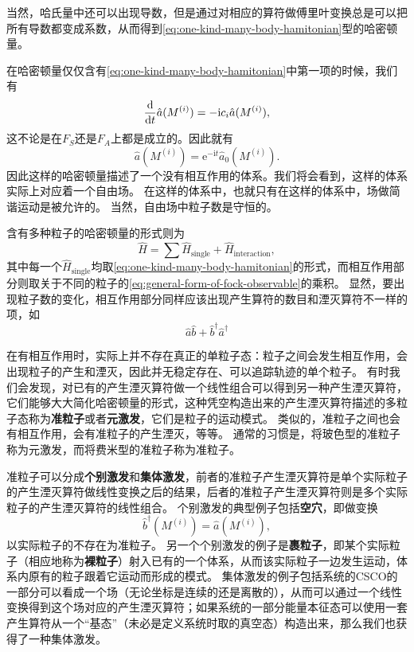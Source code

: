 \documentclass[hyperref, UTF8, a4paper]{ctexart}
\newcommand*{\ii}{\mathrm{i}}
\newcommand*{\ee}{\mathrm{e}}
\begin{document}
当然，哈氏量中还可以出现导数，但是通过对相应的算符做傅里叶变换总是可以把所有导数都变成系数，从而得到\eqref{eq:one-kind-many-body-hamitonian}型的哈密顿量。

在哈密顿量仅仅含有\eqref{eq:one-kind-many-body-hamitonian}中第一项的时候，我们有
\[
    \dv{t} \hat{a}(M^{(i)}) = - \ii c_i \hat{a} (M^{(i)}),
\]
这不论是在$F_S$还是$F_A$上都是成立的。因此就有
\[
    \hat{a} (M^{(i)}) = \ee^{- \ii t} \hat{a}_0 (M^{(i)}).
\]
因此这样的哈密顿量描述了一个没有相互作用的体系。我们将会看到，这样的体系实际上对应着一个自由场。
在这样的体系中，也就只有在这样的体系中，场做简谐运动是被允许的。
当然，自由场中粒子数是守恒的。

含有多种粒子的哈密顿量的形式则为
\begin{equation}
    \hat{H} = \sum \hat{H}_\text{single} + \hat{H}_\text{interaction},
\end{equation}
其中每一个$\hat{H}_\text{single}$均取\eqref{eq:one-kind-many-body-hamitonian}的形式，而相互作用部分则取关于不同的粒子的\eqref{eq:general-form-of-fock-observable}的乘积。
显然，要出现粒子数的变化，相互作用部分同样应该出现产生算符的数目和湮灭算符不一样的项，如
\[
    \hat{a} \hat{b} + \hat{b}^\dagger \hat{a}^\dagger
\]

在有相互作用时，实际上并不存在真正的单粒子态：粒子之间会发生相互作用，会出现粒子的产生和湮灭，因此并无稳定存在、可以追踪轨迹的单个粒子。
有时我们会发现，对已有的产生湮灭算符做一个线性组合可以得到另一种产生湮灭算符，它们能够大大简化哈密顿量的形式，这种凭空构造出来的产生湮灭算符描述的多粒子态称为\textbf{准粒子}或者\textbf{元激发}，它们是粒子的运动模式。
类似的，准粒子之间也会有相互作用，会有准粒子的产生湮灭，等等。
通常的习惯是，将玻色型的准粒子称为元激发，而将费米型的准粒子称为准粒子。

准粒子可以分成\textbf{个别激发}和\textbf{集体激发}，前者的准粒子产生湮灭算符是单个实际粒子的产生湮灭算符做线性变换之后的结果，后者的准粒子产生湮灭算符则是多个实际粒子的产生湮灭算符的线性组合。
个别激发的典型例子包括\textbf{空穴}，即做变换
\[
    \hat{b}^\dagger(M^{(i)}) = \hat{a}(M^{(i)}),
\]
以实际粒子的不存在为准粒子。
另一个个别激发的例子是\textbf{裹粒子}，即某个实际粒子（相应地称为\textbf{裸粒子}）射入已有的一个体系，从而该实际粒子一边发生运动，体系内原有的粒子跟着它运动而形成的模式。
集体激发的例子包括系统的CSCO的一部分可以看成一个场（无论坐标是连续的还是离散的），从而可以通过一个线性变换得到这个场对应的产生湮灭算符；如果系统的一部分能量本征态可以使用一套产生算符从一个“基态”（未必是定义系统时取的真空态）构造出来，那么我们也获得了一种集体激发。
\end{document}
